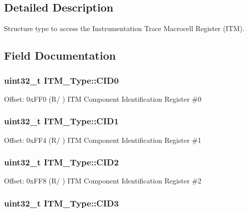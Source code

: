 \subsection{Detailed Description}
Structure type to access the Instrumentation Trace Macrocell Register (I\-T\-M). 

\subsection{Field Documentation}
\hypertarget{structITM__Type_a413f3bb0a15222e5f38fca4baeef14f6}{
\subsubsection[{C\-I\-D0}]{ uint32\-\_\-t I\-T\-M\-\_\-\-Type\-::\-C\-I\-D0}}\label{structITM__Type_a413f3bb0a15222e5f38fca4baeef14f6}
Offset\-: 0x\-F\-F0 (R/ ) I\-T\-M Component Identification Register \#0 \hypertarget{structITM__Type_a5f7d524b71f49e444ff0d1d52b3c3565}{
\subsubsection[{C\-I\-D1}]{ uint32\-\_\-t I\-T\-M\-\_\-\-Type\-::\-C\-I\-D1}}\label{structITM__Type_a5f7d524b71f49e444ff0d1d52b3c3565}
Offset\-: 0x\-F\-F4 (R/ ) I\-T\-M Component Identification Register \#1 \hypertarget{structITM__Type_adee4ccce1429db8b5db3809c4539f876}{
\subsubsection[{C\-I\-D2}]{ uint32\-\_\-t I\-T\-M\-\_\-\-Type\-::\-C\-I\-D2}}\label{structITM__Type_adee4ccce1429db8b5db3809c4539f876}
Offset\-: 0x\-F\-F8 (R/ ) I\-T\-M Component Identification Register \#2 \hypertarget{structITM__Type_a0e7aa199619cc7ac6baddff9600aa52e}{
\subsubsection[{C\-I\-D3}]{ uint32\-\_\-t I\-T\-M\-\_\-\-Type\-::\-C\-I\-D3}}\label{structITM__Type_a0e7aa199619cc7ac6baddff9600aa52e}
